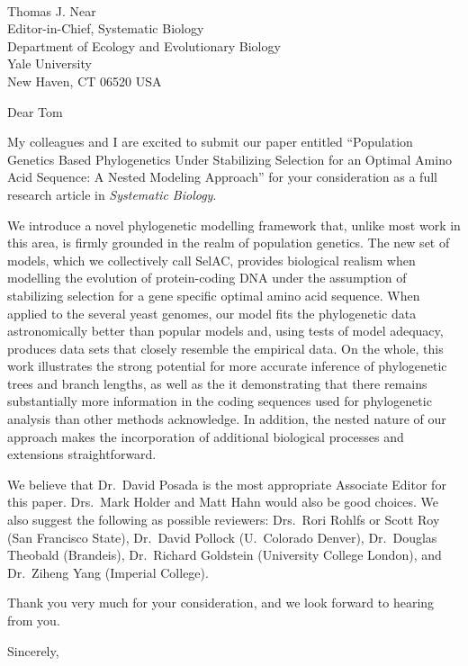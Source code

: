 \documentclass[11pt,letterpaper]{letter}
\begin{document}
\begin{letter}{
\ \\
Thomas J. Near\\
Editor-in-Chief, Systematic Biology\\
Department of Ecology and Evolutionary Biology\\
Yale University\\
New Haven, CT 06520 USA
}


\opening{Dear Tom}

My colleagues and I are excited to submit our paper entitled “Population Genetics Based Phylogenetics Under Stabilizing Selection for an Optimal Amino Acid Sequence: A Nested Modeling Approach” for your consideration as a full research article in \emph{Systematic Biology}.

We introduce a novel phylogenetic modelling framework that, unlike most work in this area, is firmly grounded in the realm of population genetics. 
The new set of models, which we collectively call SelAC, provides biological realism when modelling the evolution of protein-coding DNA under the assumption of stabilizing selection for a gene specific optimal amino acid sequence. 
When applied to the several yeast genomes, our model fits the phylogenetic data astronomically better than popular models and, using tests of model adequacy,  produces data sets that closely resemble the empirical data. 
On the whole, this work illustrates the strong potential for more accurate inference of phylogenetic trees and branch lengths, as well as the it demonstrating that there remains substantially more information in the coding sequences used for phylogenetic analysis than other methods acknowledge.
In addition, the nested nature of our approach makes the incorporation of additional biological processes and extensions straightforward. 

We believe that Dr.~David Posada is the most appropriate Associate Editor for this paper. Drs.~Mark Holder and Matt Hahn would also be good choices. 
We also suggest the following as possible reviewers: Drs.~Rori Rohlfs or Scott Roy (San Francisco State), Dr.~David Pollock (U.~Colorado Denver), Dr.~Douglas Theobald (Brandeis), Dr.~Richard Goldstein (University College London), and Dr.~Ziheng Yang (Imperial College).

Thank you very much for your consideration, and we look forward to hearing from you.


\closing{Sincerely,}
\end{letter}
\end{document}
